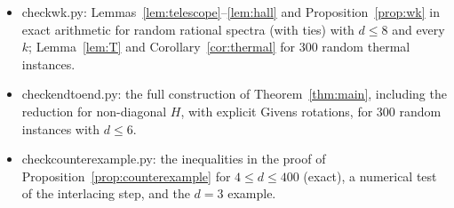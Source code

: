\documentclass[11pt]{amsart}
\theoremstyle{definition}
\theoremstyle{remark}
\numberwithin{equation}{section}
\newcommand{\sT}{\mathsf{T}}
\newcommand{\sH}{\mathsf{H}}
\newcommand{\sG}{\mathsf{G}}
\newcommand{\leanus}{\textunderscore\allowbreak}
\newcommand{\lean}[1]{{\ttfamily\let\_\leanus #1}}
\begin{document}
\begin{itemize}
$\sT,\sH,\sG$.
\item \lean{check\_wk.py}: Lemmas~\ref{lem:telescope}--\ref{lem:hall} and Proposition~\ref{prop:wk} in
exact arithmetic for random rational spectra (with ties) with $d\le8$ and every $k$; Lemma~\ref{lem:T}
and Corollary~\ref{cor:thermal} for $300$ random thermal instances.
\item \lean{check\_end\_to\_end.py}: the full construction of Theorem~\ref{thm:main}, including the
reduction for non-diagonal $H$, with explicit Givens rotations, for $300$ random instances with $d\le6$.
\item \lean{check\_counterexample.py}: the inequalities in the proof of
Proposition~\ref{prop:counterexample} for $4\le d\le400$ (exact), a numerical test of the interlacing
step, and the $d=3$ example.
\end{itemize}



\end{document}
